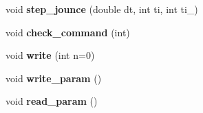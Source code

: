 \begin{DoxyCompactItemize}
\item 
\hypertarget{classPosition_aba8e066dbbecd1884a25a7805b497b74}{
void {\bfseries step\_\-jounce} (double dt, int ti, int ti\_)}
\label{classPosition_aba8e066dbbecd1884a25a7805b497b74}

\item 
\hypertarget{classPosition_a7c4796a6c9d51c12c9a391342bbdb694}{
void {\bfseries check\_\-command} (int)}
\label{classPosition_a7c4796a6c9d51c12c9a391342bbdb694}

\item 
\hypertarget{classPosition_a648d9248f431a97397b46377fe238240}{
void {\bfseries write} (int n=0)}
\label{classPosition_a648d9248f431a97397b46377fe238240}

\item 
\hypertarget{classPosition_a3b075f928cf1342c1a24e4bb60ca15c4}{
void {\bfseries write\_\-param} ()}
\label{classPosition_a3b075f928cf1342c1a24e4bb60ca15c4}

\item 
\hypertarget{classPosition_a8d9ac8c5c242abc786710f12eec6f384}{
void {\bfseries read\_\-param} ()}
\label{classPosition_a8d9ac8c5c242abc786710f12eec6f384}

\end{DoxyCompactItemize}
